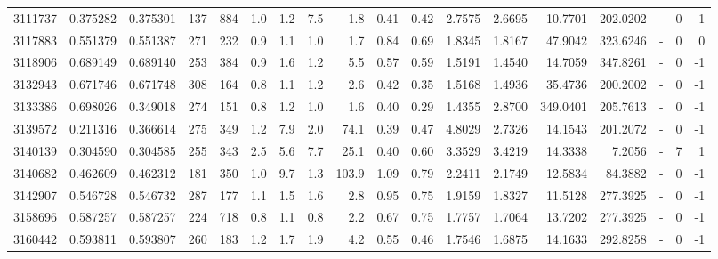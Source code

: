 \begin{tabular}{rrrrrrrrrrrrrrrlrr}
   3111737 & 0.375282 &   0.375301 &  137 &  884 &      1.0 &      1.2 &     7.5 &      1.8 &       0.41 &        0.42 &  2.7575 &  2.6695 &   10.7701 &  202.0202 &             - &        0 &         -1 \\
   3117883 & 0.551379 &   0.551387 &  271 &  232 &      0.9 &      1.1 &     1.0 &      1.7 &       0.84 &        0.69 &  1.8345 &  1.8167 &   47.9042 &  323.6246 &             - &        0 &          0 \\
   3118906 & 0.689149 &   0.689140 &  253 &  384 &      0.9 &      1.6 &     1.2 &      5.5 &       0.57 &        0.59 &  1.5191 &  1.4540 &   14.7059 &  347.8261 &             - &        0 &         -1 \\
   3132943 & 0.671746 &   0.671748 &  308 &  164 &      0.8 &      1.1 &     1.2 &      2.6 &       0.42 &        0.35 &  1.5168 &  1.4936 &   35.4736 &  200.2002 &             - &        0 &         -1 \\
   3133386 & 0.698026 &   0.349018 &  274 &  151 &      0.8 &      1.2 &     1.0 &      1.6 &       0.40 &        0.29 &  1.4355 &  2.8700 &  349.0401 &  205.7613 &             - &        0 &         -1 \\
   3139572 & 0.211316 &   0.366614 &  275 &  349 &      1.2 &      7.9 &     2.0 &     74.1 &       0.39 &        0.47 &  4.8029 &  2.7326 &   14.1543 &  201.2072 &             - &        0 &         -1 \\
   3140139 & 0.304590 &   0.304585 &  255 &  343 &      2.5 &      5.6 &     7.7 &     25.1 &       0.40 &        0.60 &  3.3529 &  3.4219 &   14.3338 &    7.2056 &             - &        7 &          1 \\
   3140682 & 0.462609 &   0.462312 &  181 &  350 &      1.0 &      9.7 &     1.3 &    103.9 &       1.09 &        0.79 &  2.2411 &  2.1749 &   12.5834 &   84.3882 &             - &        0 &         -1 \\
   3142907 & 0.546728 &   0.546732 &  287 &  177 &      1.1 &      1.5 &     1.6 &      2.8 &       0.95 &        0.75 &  1.9159 &  1.8327 &   11.5128 &  277.3925 &             - &        0 &         -1 \\
   3158696 & 0.587257 &   0.587257 &  224 &  718 &      0.8 &      1.1 &     0.8 &      2.2 &       0.67 &        0.75 &  1.7757 &  1.7064 &   13.7202 &  277.3925 &             - &        0 &         -1 \\
   3160442 & 0.593811 &   0.593807 &  260 &  183 &      1.2 &      1.7 &     1.9 &      4.2 &       0.55 &        0.46 &  1.7546 &  1.6875 &   14.1633 &  292.8258 &             - &        0 &         -1 \\

\end{tabular}
